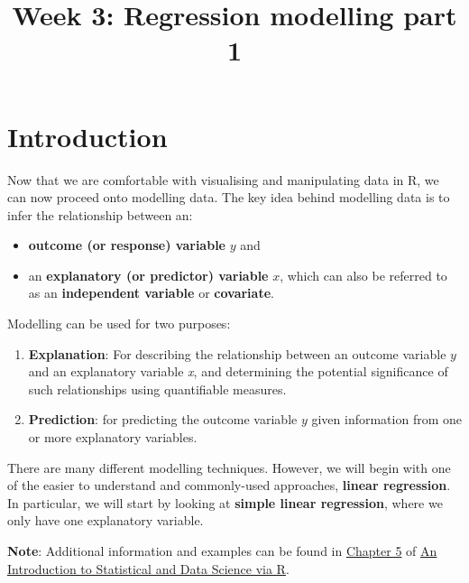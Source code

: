 \documentclass[
  letterpaper,
  DIV=11,
  numbers=noendperiod]{scrartcl}
\title{Week 3: Regression modelling part 1}
\author{}
\date{}
\makeatletter
\providecommand{\tightlist}{%
  \setlength{\itemsep}{0pt}\setlength{\parskip}{0pt}}\usepackage{longtable,booktabs,array}
\renewcommand{\maketitle}{\bgroup\setlength{\parindent}{0pt}
\begin{flushleft}
  {\color{uniblue}\sffamily\huge\textbf{\@title}} \vspace{0.3cm} \newline
  {\Large {\@subtitle}} \newline
  \@author
\end{flushleft}\egroup
}
\renewcommand*\contentsname{Table of contents}
\newcommand\contentsname{Table of contents}
\makeatother
\begin{document}
\maketitle

\pagestyle{mystyle}

\renewcommand*\contentsname{Contents}
{
\hypersetup{linkcolor=}
\setcounter{tocdepth}{3}
\tableofcontents
}
\section{Introduction}\label{introduction}

Now that we are comfortable with visualising and manipulating data in R,
we can now proceed onto modelling data. The key idea behind modelling
data is to infer the relationship between an:

\begin{itemize}
\tightlist
\item
  \textbf{outcome (or response) variable} \(y\) and
\item
  an \textbf{explanatory (or predictor) variable} \(x\), which can also
  be referred to as an \textbf{independent variable} or
  \textbf{covariate}.
\end{itemize}

Modelling can be used for two purposes:

\begin{enumerate}
\def\labelenumi{\arabic{enumi}.}
\item
  \textbf{Explanation}: For describing the relationship between an
  outcome variable \(y\) and an explanatory variable \emph{x}, and
  determining the potential significance of such relationships using
  quantifiable measures.
\item
  \textbf{Prediction}: for predicting the outcome variable \(y\) given
  information from one or more explanatory variables.
\end{enumerate}

There are many different modelling techniques. However, we will begin
with one of the easier to understand and commonly-used approaches,
\textbf{linear regression}. In particular, we will start by looking at
\textbf{simple linear regression}, where we only have one explanatory
variable.

\textbf{Note}: Additional information and examples can be found in
\href{https://moderndive.com/5-regression.html}{Chapter 5} of
\href{https://moderndive.com/index.html}{An Introduction to Statistical
and Data Science via R}.
\end{document}
